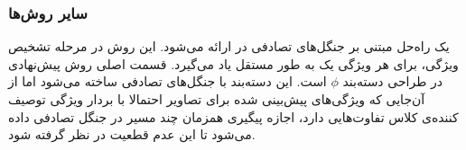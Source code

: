\subsubsection{سایر روش‌ها}\label{other}
یک راه‌حل مبتنی بر جنگل‌های تصادفی  در \cite{ jayaraman14} ارائه می‌شود. این روش در مرحله تشخیص ویژگی، برای هر ویژگی یک   به طور مستقل یاد می‌گیرد. قسمت اصلی روش پیش‌نهادی در طراحی دسته‌بند $\phi$ است. این دسته‌بند با جنگل‌های تصادفی ساخته می‌شود اما از آن‌جایی که ویژگی‌های پیش‌بینی شده برای تصاویر احتمالا با بردار ویژگی توصیف کننده‌ی کلاس تفاوت‌هایی دارد، اجازه پیگیری همزمان چند مسیر در جنگل تصادفی داده می‌شود تا این عدم قطعیت در نظر گرفته شود. 

